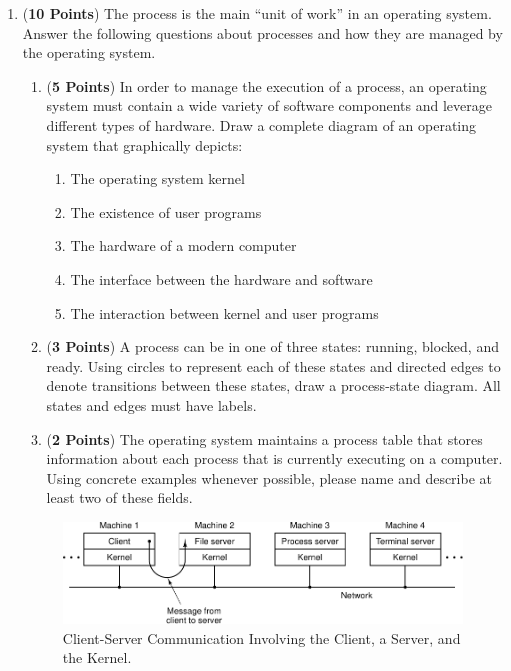 \documentclass[12pt,epsf,psfig,graphics]{article}
\begin{document}
\begin{enumerate}

\item ({\bf 10 Points}) The process is the main ``unit of work'' in an operating system.  Answer the following questions
  about processes and how they are managed by the operating system.

  \begin{enumerate}

    \item ({\bf 5 Points}) In order to manage the execution of a process, an operating system must contain a wide
      variety of software components and leverage different types of hardware.  Draw a complete diagram of an operating
      system that graphically depicts:

      \begin{enumerate}

        \item The operating system kernel
        \item The existence of user programs
        \item The hardware of a modern computer
        \item The interface between the hardware and software
        \item The interaction between kernel and user programs

      \end{enumerate}

    \item ({\bf 3 Points}) A process can be in one of three states: running, blocked, and ready. Using circles to
      represent each of these states and directed edges to denote transitions between these states, draw a process-state
      diagram. All states and edges must have labels.

    \item ({\bf 2 Points}) The operating system maintains a process table that stores information about each process
      that is currently executing on a computer. Using concrete examples whenever possible, please name and describe at
      least two of these fields.

  \end{enumerate}

  \newpage

\begin{figure}[t]
  \centering
  \includegraphics{fig1-27}
  \caption{Client-Server Communication Involving the Client, a Server, and the Kernel.}
  \label{fig:clientserver}
\end{figure}


\end{enumerate}
\end{document}
